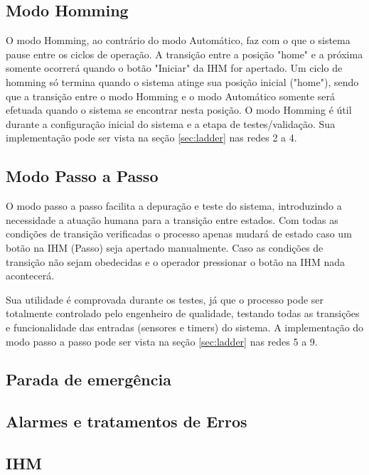 \documentclass[12pt]{article}
\begin{document}
	\subsection{Modo Homming}
		
	O modo Homming, ao contrário do modo Automático, faz com o que o sistema pause entre os ciclos de operação. A transição entre a posição "home" e a próxima somente ocorrerá quando o botão "Iniciar" da IHM for apertado. Um ciclo de homming só termina quando o sistema atinge sua posição inicial ("home"), sendo que a transição entre o modo Homming e o modo Automático somente será efetuada quando o sistema se encontrar nesta posição. O modo Homming é útil durante a configuração inicial do sistema e a etapa de testes/validação. Sua implementação pode ser vista na seção \ref{sec:ladder} nas redes 2 a 4. 
	
	
	\subsection{Modo Passo a Passo}

	O modo passo a passo facilita a depuração e teste do sistema, introduzindo a necessidade a atuação humana para a transição entre estados. Com todas as condições de transição verificadas o processo apenas mudará de estado caso um botão na IHM (Passo) seja apertado manualmente. Caso as condições de transição não sejam obedecidas e o operador pressionar o botão na IHM nada acontecerá.
	
	Sua utilidade é comprovada durante os testes, já que o processo pode ser totalmente controlado pelo engenheiro de qualidade, testando todas as transições e funcionalidade das entradas (sensores e timers) do sistema. A implementação do modo passo a passo pode ser vista na seção \ref{sec:ladder} nas redes 5 a 9.
	
	\subsection{Parada de emergência}
	
	\subsection{Alarmes e tratamentos de Erros}
	
	\subsection{IHM}
	
\end{document}
